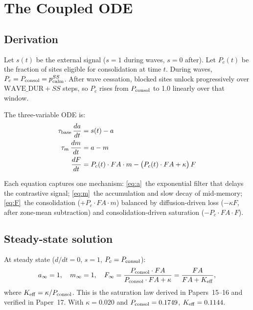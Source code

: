 \documentclass[11pt]{article}
\begin{document}
\section{The Coupled ODE}

\subsection{Derivation}

Let $s(t)$ be the external signal ($s=1$ during waves, $s=0$ after).
Let $P_c(t)$ be the fraction of sites eligible for consolidation at time $t$.
During waves, $P_c = P_{\rm consol} = p_{\rm calm}^{SS}$.
After wave cessation, blocked sites unlock progressively over $\mathrm{WAVE\_DUR} + SS$
steps, so $P_c$ rises from $P_{\rm consol}$ to 1.0 linearly over that window.

The three-variable ODE is:
\begin{align}
  \tau_{\rm base}\,\frac{da}{dt} &= s(t) - a \label{eq:a}\\
  \tau_m\,\frac{dm}{dt}          &= a - m   \label{eq:m}\\
  \frac{dF}{dt}                  &= P_c(t)\cdot FA\cdot m
                                     - \bigl(P_c(t)\cdot FA + \kappa\bigr)\,F \label{eq:F}
\end{align}

Each equation captures one mechanism:
\eqref{eq:a}~the exponential filter that delays the contrastive signal;
\eqref{eq:m}~the accumulation and slow decay of mid-memory;
\eqref{eq:F}~the consolidation ($+P_c\cdot FA\cdot m$) balanced by
diffusion-driven loss ($-\kappa F$, after zone-mean subtraction) and
consolidation-driven saturation ($-P_c\cdot FA\cdot F$).

\subsection{Steady-state solution}

At steady state ($d/dt = 0$, $s=1$, $P_c = P_{\rm consol}$):
\begin{equation}
  a_\infty = 1,\quad
  m_\infty = 1,\quad
  F_\infty = \frac{P_{\rm consol}\cdot FA}{P_{\rm consol}\cdot FA + \kappa}
           = \frac{FA}{FA + K_{\rm eff}},
  \label{eq:ss}
\end{equation}
where $K_{\rm eff} = \kappa/P_{\rm consol}$.
This is the saturation law derived in Papers~15--16 and verified in Paper~17.
With $\kappa = 0.020$ and $P_{\rm consol} = 0.1749$, $K_{\rm eff} = 0.1144$.
\end{document}
